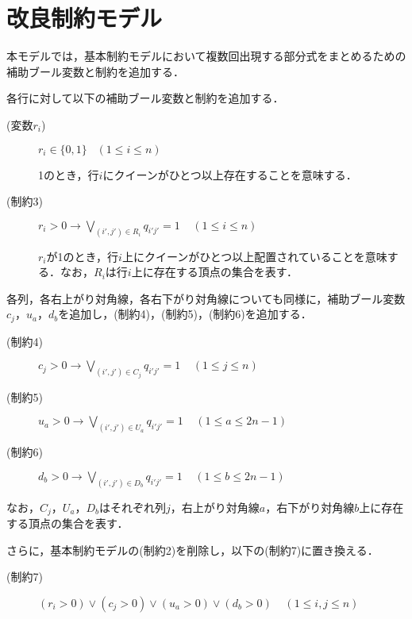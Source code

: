\section{改良制約モデル}
本モデルでは，基本制約モデルにおいて複数回出現する部分式をまとめるための補助ブール変数と制約を追加する．\par
各行に対して以下の補助ブール変数と制約を追加する．
\begin{description}
 \item[(変数$r_i$)] $r_{i} \in \{0,1\} \;\;\; (1 \leq i \leq n)$\par
1のとき，行$i$にクイーンがひとつ以上存在することを意味する．
 \item[(制約3)] $r_{i}>0 \rightarrow \bigvee\limits_{(i',j')\in R_{i}} q_{i'j'}=1 \;\;\;\; (1 \leq i \leq n)$ \par
$r_{i}$が1のとき，行$i$上にクイーンがひとつ以上配置されていることを意味する．なお，$R_i$は行$i$上に存在する頂点の集合を表す．
\end{description}
各列，各右上がり対角線，各右下がり対角線についても同様に，補助ブール変数$c_{j}$，$u_{a}$，$d_{b}$を追加し，(制約4)，(制約5)，(制約6)を追加する．
\begin{description}
 \item[(制約4)] $c_{j}>0 \rightarrow \bigvee\limits_{(i',j')\in C_{j}} q_{i'j'}=1 \;\;\;\; (1 \leq j \leq n)$ 
 \item[(制約5)] $u_{a}>0 \rightarrow \bigvee\limits_{(i',j')\in U_{a}} q_{i'j'}=1 \;\;\;\; (1 \leq a \leq 2n-1)$ 
 \item[(制約6)] $d_{b}>0 \rightarrow \bigvee\limits_{(i',j')\in D_{b}} q_{i'j'}=1 \;\;\;\; (1 \leq b \leq 2n-1)$
\end{description}
なお，$C_j$，$U_{a}$，$D_{b}$はそれぞれ列$j$，右上がり対角線$a$，右下がり対角線$b$上に存在する頂点の集合を表す．\par
さらに，基本制約モデルの(制約2)を削除し，以下の(制約7)に置き換える．
\begin{description}
 \item[(制約7)] $(r_i > 0) \vee (c_j >0) \vee (u_{a}>0) \vee (d_{b}>0) \;\;\;\; (1 \leq i,j \leq n)$
\end{description}
\newpage
